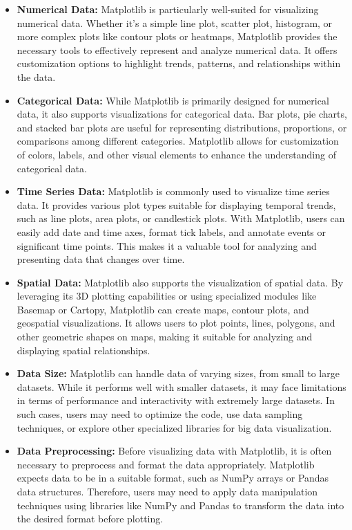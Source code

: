 \begin{itemize}
	\item \textbf{Numerical Data:} Matplotlib is particularly well-suited for visualizing numerical data. Whether it's a simple line plot, scatter plot, histogram, or more complex plots like contour plots or heatmaps, Matplotlib provides the necessary tools to effectively represent and analyze numerical data. It offers customization options to highlight trends, patterns, and relationships within the data.
	
	\item \textbf{Categorical Data:} While Matplotlib is primarily designed for numerical data, it also supports visualizations for categorical data. Bar plots, pie charts, and stacked bar plots are useful for representing distributions, proportions, or comparisons among different categories. Matplotlib allows for customization of colors, labels, and other visual elements to enhance the understanding of categorical data.
	
	\item \textbf{Time Series Data:} Matplotlib is commonly used to visualize time series data. It provides various plot types suitable for displaying temporal trends, such as line plots, area plots, or candlestick plots. With Matplotlib, users can easily add date and time axes, format tick labels, and annotate events or significant time points. This makes it a valuable tool for analyzing and presenting data that changes over time.
	
	\item \textbf{Spatial Data:} Matplotlib also supports the visualization of spatial data. By leveraging its 3D plotting capabilities or using specialized modules like Basemap or Cartopy, Matplotlib can create maps, contour plots, and geospatial visualizations. It allows users to plot points, lines, polygons, and other geometric shapes on maps, making it suitable for analyzing and displaying spatial relationships.
	
	\item \textbf{Data Size:} Matplotlib can handle data of varying sizes, from small to large datasets. While it performs well with smaller datasets, it may face limitations in terms of performance and interactivity with extremely large datasets. In such cases, users may need to optimize the code, use data sampling techniques, or explore other specialized libraries for big data visualization.
	
	\item \textbf{Data Preprocessing:} Before visualizing data with Matplotlib, it is often necessary to preprocess and format the data appropriately. Matplotlib expects data to be in a suitable format, such as NumPy arrays or Pandas data structures. Therefore, users may need to apply data manipulation techniques using libraries like NumPy and Pandas to transform the data into the desired format before plotting.
\end{itemize}


